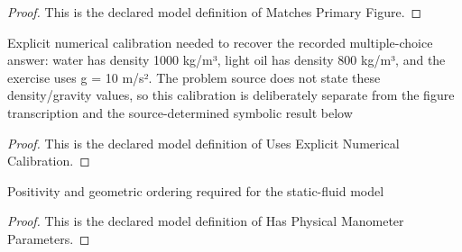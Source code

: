 \begin{proof}
  This is the declared model definition of Matches Primary Figure.
\end{proof}
\begin{definition}
  \label{def:physics:phyx-mini-0388:phyxminiproblems-problemphyxmini0388-usesexplicitnumericalcalibration}
  Explicit numerical calibration needed to recover the recorded multiple-choice answer: water has density 1000 kg/m³, light oil has density 800 kg/m³, and the exercise uses g = 10 m/s². The problem source does not state these density/gravity values, so this calibration is deliberately separate from the figure transcription and the source-determined symbolic result below
\end{definition}
\begin{proof}
  This is the declared model definition of Uses Explicit Numerical Calibration.
\end{proof}
\begin{definition}
  \label{def:physics:phyx-mini-0388:phyxminiproblems-problemphyxmini0388-hasphysicalmanometerparameters}
  Positivity and geometric ordering required for the static-fluid model
\end{definition}
\begin{proof}
  This is the declared model definition of Has Physical Manometer Parameters.
\end{proof}
